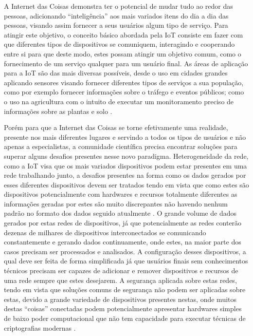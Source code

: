 \documentclass[ti,table]{texufpel} %
\begin{document}
A Internet das Coisas demonstra ter o potencial de mudar tudo ao redor das pessoas, adicionando ``inteligência'' aos mais variados itens do dia a dia das pessoas, visando assim fornecer a seus usuários algum tipo de serviço. Para atingir este objetivo, o conceito básico abordada pela IoT consiste em fazer com que diferentes tipos de dispositivos se comuniquem, interagindo e cooperando entre si para que deste modo, estes possam atingir um objetivo comum, como o fornecimento de um serviço qualquer para um usuário final. As áreas de aplicação para a IoT são das mais diversas possíveis, desde o uso em cidades grandes aplicando sensores visando fornecer diferentes tipos de serviços a sua população, como por exemplo fornecer informações sobre o tráfego e eventos públicos; como o uso na agricultura com o intuito de executar um monitoramento preciso de  informações sobre as plantas e solo \cite{gonccalves2017research}. 

  

Porém para que a Internet das Coisas se torne efetivamente uma realidade, presente nos mais diferentes lugares e servindo a todos os tipos de usuários e não apenas a especialistas, a comunidade científica precisa encontrar soluções para superar alguns desafios presentes nesse novo paradigma. Heterogeneidade da rede, como a IoT visa que os mais variados dispositivos podem estar presentes em uma rede trabalhando junto, a desafios presentes na forma como os dados gerados por esses diferentes dispositivos devem ser tratados tendo em vista que como estes são dispositivos potencialmente com hardwares e recursos totalmente diferentes as informações geradas por estes são muito discrepantes não havendo nenhum padrão no formato dos dados seguido atualmente \cite{agrawal2013survey}. O grande volume de dados gerados por estas redes de dispositivos, já que potencialmente as redes conterão dezenas de milhares de dispositivos interconectados se comunicando constantemente e gerando dados continuamente, onde estes, na maior parte dos casos precisam ser processados e analisados. A configuração desses dispositivos, a qual deve ser feita de forma simplificada já que usuários finais sem conhecimentos técnicos precisam ser capazes de adicionar e remover dispositivos e recursos de uma rede sempre que estes desejarem. A segurança aplicada sobre estas redes, tendo em vista que soluções comuns de segurança não podem ser aplicadas sobre estas,  devido a grande variedade de dispositivos presentes nestas, onde muitos destas ``coisas'' conectadas podem potencialmente apresentar hardwares simples de baixo poder computacional que não tem capacidade para executar técnicas de criptografias modernas \cite{agrawal2013survey}. 
\end{document}
